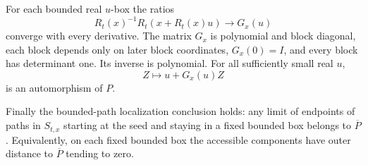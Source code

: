 \begin{theorem}
For each bounded real $u$-box the ratios
\begin{equation}\label{win:ratio}
           R_t(x)^{-1}R_t(x+R_t(x)u)\longrightarrow G_x(u)
\end{equation}
converge with every derivative.  The matrix $G_x$ is polynomial and
block diagonal, each block depends only on later block coordinates,
$G_x(0)=I$, and every block has determinant one.  Its inverse is
polynomial.  For all sufficiently small real $u$,
\begin{equation}\label{win:orbit}
                           Z\longmapsto u+G_x(u)Z
\end{equation}
is an automorphism of $P$.

Finally the bounded-path localization conclusion holds: any limit
of endpoints of paths in $S_{t,x}$ starting at the seed and staying
in a fixed bounded box belongs to $\overline P$.  Equivalently, on
each fixed bounded box the accessible components have outer
distance to $\overline P$ tending to zero.
\end{theorem}

